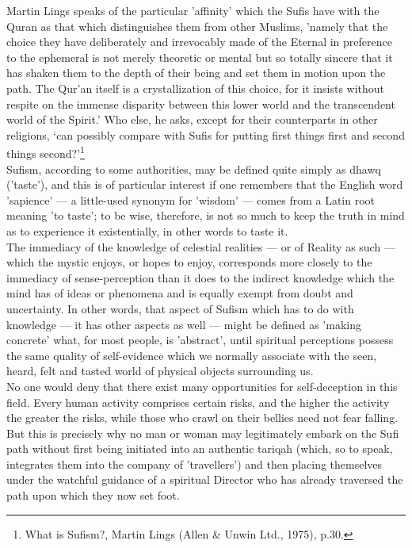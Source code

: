 \documentclass[10pt, twoside,openright]{book}
\begin{document}
Martin Lings speaks of the particular 'affinity' which the Sufis have with the Quran as that which 
distinguishes them from other Muslims, 'namely that the choice they have deliberately and irrevocably 
made of the Eternal in preference to the ephemeral is not merely theoretic or mental but so totally 
sincere that it has shaken them to the depth of their being and set them in motion upon the path. The 
Qur'an itself is a crystallization of this choice, for it insists without respite on the immense 
disparity between this lower world and the transcendent world of the Spirit.' Who else, he asks, 
except for their counterparts in other religions, `can possibly compare with Sufis for putting first 
things first and second things second?'\footnote{What is Sufism?, Martin Lings (Allen \& Unwin Ltd., 1975), p.30.} \\

Sufism, according to some authorities, may be defined quite simply as dhawq ('taste'), and this is of 
particular interest if one remembers that the English word 'sapience' --- a little-used synonym for 
'wisdom' --- comes from a Latin root meaning 'to taste'; to be wise, therefore, is not so much to keep 
the truth in mind as to experience it existentially, in other words to taste it. \\

The immediacy of the knowledge of celestial realities --- or of Reality as such --- which the mystic 
enjoys, or hopes to enjoy, corresponds more closely to the immediacy of sense\hyp{}perception than it does 
to the indirect knowledge which the mind has of ideas or phenomena and is equally exempt from doubt 
and uncertainty. In other words, that aspect of Sufism which has to do with knowledge --- it has other 
aspects as well --- might be defined as 'making concrete' what, for most people, is 'abstract', until 
spiritual perceptions possess the same quality of self\hyp{}evidence which we normally associate with the 
seen, heard, felt and tasted world of physical objects surrounding us. \\

No one would deny that there exist many opportunities for self\hyp{}deception in this field. Every human 
activity comprises certain risks, and the higher the activity the greater the risks, while those who 
crawl on their bellies need not fear falling. But this is precisely why no man or woman may 
legitimately embark on the Sufi path without first being initiated into an authentic tariqah (which, 
so to speak, integrates them into the company of 'travellers') and then placing themselves under the 
watchful guidance of a spiritual Director who has already traversed the path upon which they now set 
foot. \\
\end{document}

